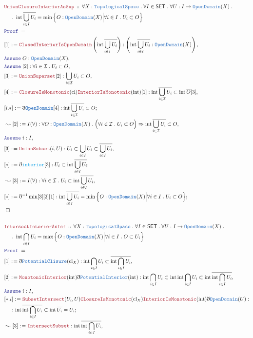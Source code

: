 \documentclass[12pt]{scrartcl}
\newcommand{\TYPE}[1]{\textcolor{NavyBlue}{\mathtt{#1}}}
\newcommand{\FUNC}[1]{\textcolor{Cerulean}{\mathtt{#1}}}
\newcommand{\LOGIC}[1]{\textcolor{Blue}{\mathtt{#1}}}
\newcommand{\THM}[1]{\textcolor{Maroon}{\mathtt{#1}}}
\renewcommand{\.}{\; . \;}
\newcommand{\de}{: \kern 0.1pc =}
\newcommand{\Act}[1]{\left( #1 \right)}
\newcommand{\Theorem}[2]{& \THM{#1} \, :: \, #2 \\ & \Proof = \\ }
\newcommand{\NewLine}{\\ & \kern 1pc}
\newcommand{\Page}[1]{ \begin{align*} #1 \end{align*}   }
\newcommand{ \bd }{ \ByDef }
\newcommand{\Imply}{\Rightarrow}
\newcommand{\Say}[3]{& #1 \de #2 : #3, \\}
\newcommand{\Conclude}[3]{& #1 \de #2 : #3; \\}
\newcommand{\Derive}[3]{& \leadsto #1 \de #2 : #3, \\}
\newcommand{\Assume}[2]{& \LOGIC{Assume} \; #1 : #2, \\}
\newcommand{\QED}{\; \square}
\newcommand{\EndProof}{& \QED \\}
\newcommand{\ByDef}{\eth}
\newcommand{\Proof}{\LOGIC{Proof} \; }
\newcommand{\I}{\mathcal{I}}
\newcommand{\SET}{\mathsf{SET}}
\newcommand{\TS}{\TYPE{TopologicalSpace}}
\DeclareMathOperator*{\intx}{int}
\DeclareMathOperator*{\cl}{cl}
\begin{document}
\Page{
	\Theorem{UnionClosureInteriorAsSup}
	{
		\forall X : \TS \.
		\forall I \in \SET \.
		\forall U : I \to \TYPE{OpenDomain}(X) \.
		\NewLine \. 
		\intx \overline{\bigcup_{i \in I} U_i} =
		\min \Big\{ O : \TYPE{OpenDomain}(X) \Big| 
		\forall i \in I \. U_i \subset O  \Big\} 
	}
	\Say{[1]}{
		\THM{ClosedInteriorIsOpenDomain}
		\Act{ \intx \overline{\bigcup_{i \in I} U_i}  }
	}
	{
		   \Act{  \intx \overline{\bigcup_{i \in I} U_i} : \TYPE{OpenDomain}(X) } 
	}
	\Assume{O}{\TYPE{OpenDomain}(X)}
	\Assume{[2]}{ \forall i \in \I \. U_i \subset O   }
	\Say{[3]}{\THM{UnionSuperset}[2]}{\bigcup_{i \in \I} U_i \subset O}
	\Say{[4]}{\THM{ClosureIsMonotonic}(\cl)\THM{InteriorIsMonotonic}(\intx)[1]}
	{  \intx \overline{\bigcup_{i \in \I} U_i} \subset \intx \overline{O}[3]   }
	\Conclude{[i.*]}{ \bd \TYPE{OpenDomain}[4] }
	{ \intx \overline{\bigcup_{i \in \I} U_i} \subset O   }
	\Derive{[2]}{I(\forall)}
	{
		\forall O : \TYPE{OpenDomain}(X) \.
		\Big(\forall i \in \I \. U_i \subset O\Big) 
		\Imply
		\intx \overline{\bigcup_{i \in \I} U_i} \subset O 
	}
	\Assume{i}{I}
	\Say{[3]}{\THM{UnionSubset}(i,U)}
	{ 
		U_i \subset \bigcup_{i \in I} U_i \subset 
		\overline{\bigcup_{i \in I} U_i} 
	}
	\Conclude{[*]}{\bd \FUNC{interior}[3] }
	{ U_i \subset \intx \overline{\bigcup_{i \in I} U_i}  }
	\Derive{[3]}
	{I(\forall) }
	{\forall i \in \I \. U_i \subset \intx \overline{\bigcup_{i \in I} U_i} }
	\Conclude{[*]}{\bd^{-1}\min[3][2][1]}
	{
		\intx \overline{\bigcup_{i \in I} U_i}
		=
		\min \Big\{ O : \TYPE{OpenDomain}(X) \Big| 
		\forall i \in I \. U_i \subset O  \Big\} 
	}
	\EndProof
	\\
	\Theorem{IntersectInteriorAsInf}
	{
		\forall X : \TS \.
		\forall I \in \SET \.
		\forall U : I \to \TYPE{OpenDomain}(X) \.
		\NewLine \. 
		\intx \bigcap_{i \in I} U_i =
		\max \Big\{ O : \TYPE{OpenDomain}(X) \Big| 
		\forall i \in I \.  O \subset U_i  \Big\} 
	}
	\Say{[1]}{\bd \TYPE{PotentialClisure}({\cl}_X)}
	{
		\intx \bigcap_{i \in I} U_i \subset
		\overline{\intx \bigcap_{i \in I} U_i}
	}
	\Say{[2]}{\THM{MonotonicInterior}(\intx)\bd \TYPE{PotentialInterior}(\intx)}
	{
		\intx \bigcap_{i \in I} U_i \subset 
		\intx \intx \bigcap_{i \in I} U_i \subset 
		\intx \overline{\intx \bigcap_{i \in I} U_i}	
	}
	\Assume{i}{I}
	\Conclude{[*.i]}{ 
		\THM{SubsetIntersect}(U_i,U)
		\THM{ClosureIsMonotonic}({\cl}_X) 
		\THM{InteriorIsMonotonic}(\intx)
		\bd \TYPE{OpenDomain}(U)
	}
	{
		\NewLine : 
		\intx \overline{\intx\bigcap_{i \in I} U_i} \subset
		\intx \overline{U_i} =
		U_i
	}
	\Derive{[3]}{\THM{IntersectSubset}}
	{
		\intx \overline{\intx\bigcap_{i \in I} U_i}
}}
\end{document}
